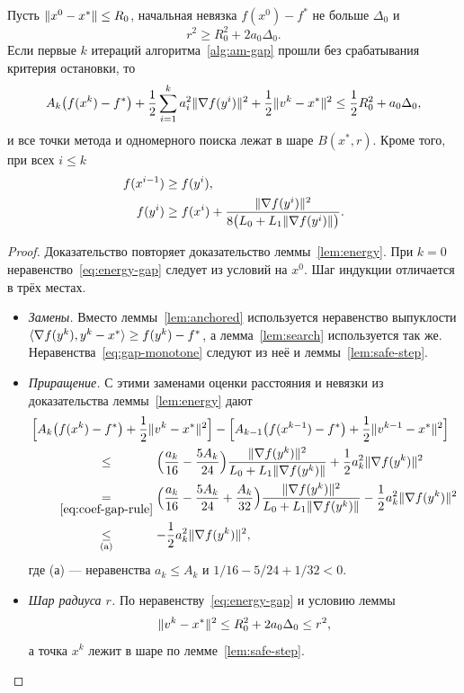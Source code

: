 \begin{lemma}\label{lem:energy-gap}
Пусть $\|x^0-x^\ast\|\le R_0$, начальная невязка $f(x^0)-f^\ast$ не больше $\Delta_0$ и
\[
 r^2\ge R_0^2+2a_0\Delta_0 .
\]
Если первые $k$ итераций алгоритма~\ref{alg:am-gap} прошли без срабатывания критерия остановки, то
\begin{equation}\label{eq:energy-gap}
 A_k\bigl(f(x^k)-f^\ast\bigr)+\frac12\sum_{i=1}^ka_i^2\|\nabla f(y^i)\|^2+\frac12\|v^k-x^\ast\|^2\le\frac12R_0^2+a_0\Delta_0 ,
\end{equation}
и все точки метода и одномерного поиска лежат в шаре $B(x^\ast,r)$. Кроме того, при всех $i\le k$
\begin{equation}\label{eq:gap-monotone}
\begin{aligned}
 f(x^{i-1})&\ge f(y^i),\\
 f(y^i)&\ge f(x^i)+\frac{\|\nabla f(y^i)\|^2}{8\bigl(L_0+L_1\|\nabla f(y^i)\|\bigr)} .
\end{aligned}
\end{equation}
\end{lemma}

\begin{proof}
Доказательство повторяет доказательство леммы~\ref{lem:energy}. При $k=0$ неравенство~\eqref{eq:energy-gap} следует из условий на $x^0$. Шаг индукции отличается в трёх местах.
\begin{itemize}
\item \emph{Замены.} Вместо леммы~\ref{lem:anchored} используется неравенство выпуклости $\langle \nabla f(y^k),y^k-x^\ast\rangle\ge f(y^k)-f^\ast$, а лемма~\ref{lem:search} используется так же. Неравенства~\eqref{eq:gap-monotone} следуют из неё и леммы~\ref{lem:safe-step}.
\item \emph{Приращение.} С этими заменами оценки расстояния и невязки из доказательства леммы~\ref{lem:energy} дают
\begin{align*}
 \MoveEqLeft\Bigl[A_k\bigl(f(x^k)-f^\ast\bigr)+\frac12\norm{v^k-x^\ast}^2\Bigr]-\Bigl[A_{k-1}\bigl(f(x^{k-1})-f^\ast\bigr)+\frac12\norm{v^{k-1}-x^\ast}^2\Bigr]\\
 &\bypad{\le}{}{\eqref{eq:coef-gap-rule}}\Bigl(\frac{a_k}{16}-\frac{5A_k}{24}\Bigr)\frac{\norm{\nabla f(y^k)}^2}{L_0+L_1\norm{\nabla f(y^k)}}+\frac12a_k^2\norm{\nabla f(y^k)}^2\\
 &\by{=}{\eqref{eq:coef-gap-rule}}\Bigl(\frac{a_k}{16}-\frac{5A_k}{24}+\frac{A_k}{32}\Bigr)\frac{\norm{\nabla f(y^k)}^2}{L_0+L_1\norm{\nabla f(y^k)}}-\frac12a_k^2\norm{\nabla f(y^k)}^2\\
 &\bypad{\le}{(\mathrm a)}{\eqref{eq:coef-gap-rule}}-\frac12a_k^2\norm{\nabla f(y^k)}^2 ,
\end{align*}
где (а) --- неравенства $a_k\le A_k$ и $1/16-5/24+1/32<0$.
\item \emph{Шар радиуса $r$.} По неравенству~\eqref{eq:energy-gap} и условию леммы
\[
 \|v^k-x^\ast\|^2\le R_0^2+2a_0\Delta_0\le r^2 ,
\]
а точка $x^k$ лежит в шаре по лемме~\ref{lem:safe-step}.\qedhere
\end{itemize}
\end{proof}

